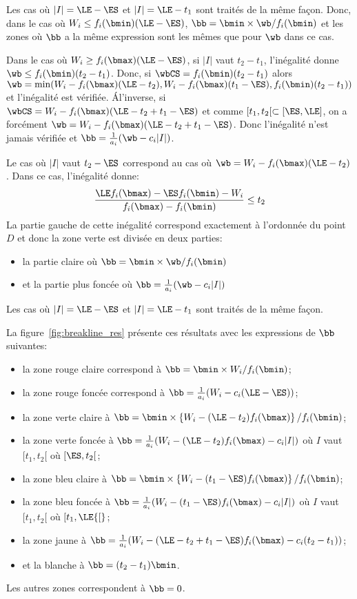 Les cas où $|I| = \LE -\ES$ et $|I| =
\LE -t_1$ sont traités de la même façon. Donc, dans le cas où $W_i \le
f_i(\bmin) (\LE - \ES)$, $\bb=\bmin \times \wb/f_i(\bmin)$ et les
zones où $\bb$ a la même expression sont les mêmes que pour $\wb$ dans
ce cas. 

Dans le cas où $W_i \ge f_i(\bmax)(\LE - \ES)$, si $|I|$ vaut
$t_2-t_1$, l'inégalité donne $\wb \le f_i(\bmin)(t_2-t_1)$. Donc, si
$\wbCS=f_i(\bmin) (t_2-t_1)$ alors $\wb=\min(W_i -
f_i(\bmax)(\LE-t_2), W_i - f_i(\bmax)(t_1-\ES),
f_i(\bmin)(t_2-t_1))$ et l'inégalité est vérifiée. {\'A}l'inverse, si
$\wbCS=W_i - f_i(\bmax)(\LE - t_2 +t_1 - \ES)$ et comme $[t_1,t_2[
\subset [\ES,\LE]$, on a forcément $\wb=W_i - f_i(\bmax)(\LE - t_2
+t_1 - \ES)$. Donc l'inégalité n'est jamais vérifiée et
$\bb=\frac{1}{a_i}(\wb-c_i|I|)$. 

Le cas où $|I|$ vaut $t_2 - \ES$ correspond au cas où
$\wb=W_i-f_i(\bmax)(\LE-t_2)$. Dans ce cas, l'inégalité donne: 
\[ \frac{\LE f_i(\bmax) - \ES f_i(\bmin) - W_i}{f_i(\bmax)-f_i(\bmin)}
  \le t_2 \]
La partie gauche de cette inégalité correspond exactement à l'ordonnée
du point $D$ et donc la zone verte est divisée en deux parties:
\begin{itemize}
\item la partie claire où $\bb= \bmin \times \wb / f_i(\bmin)$
\item  et la partie plus foncée où $\bb=\frac{1}{a_i}(\wb - c_i|I|)$
\end{itemize}
Les cas où $|I| = \LE -\ES$ et $|I| = \LE -t_1$ sont traités de la
même façon.

La figure~\ref{fig:breakline_res} présente ces résultats avec les
 expressions de $\bb$ suivantes:
 \begin{itemize}
 \item la zone rouge claire correspond à $\bb=\bmin \times W_i/f_i(\bmin)$;
 \item la zone rouge foncée correspond à $\bb=\frac{1}{a_i}(W_i - c_i (\LE - \ES))$;
 \item la zone verte claire à $\bb=\bmin \times
   \left\{W_i-(\LE-t_2)f_i(\bmax)\right\}/ f_i(\bmin)$;
 \item la zone verte foncée à
   $\bb=\frac{1}{a_i}(W_i-(\LE-t_2)f_i(\bmax) - c_i |I|)$ où $I$ vaut
   $[t_1,t_2[$ où $[\ES,t_2[$;
 \item la zone bleu claire à $\bb=\bmin \times \left\{W_i-(t_1-\ES)f_i(\bmax)\right\}/f_i(\bmin)$;
 \item la zone bleu foncée à $\bb=\frac{1}{a_i}(W_i-(t_1-\ES)f_i(\bmax) - c_i
   |I|)$ où $I$ vaut  $[t_1,t_2[$ où $[t_1,\LE{[}$;
 \item la zone jaune à
   $\bb=\frac{1}{a_i}(W_i-(\LE-t_2+t_1-\ES)f_i(\bmax) - c_i (t_2 - t_1))$;
 \item et la blanche à $\bb=(t_2-t_1) \bmin$.
 \end{itemize}
 Les autres zones correspondent à $\bb=0$.

